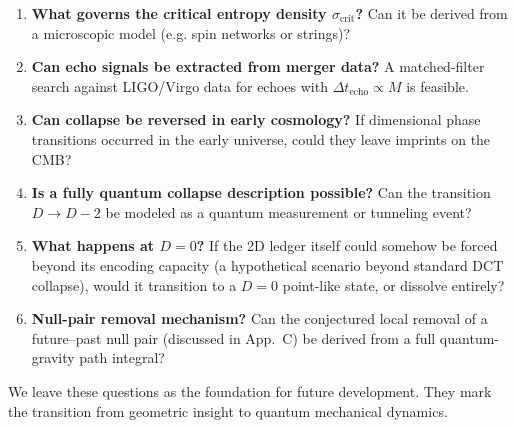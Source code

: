 \documentclass[a4paper, 12pt, oneside]{book}
\numberwithin{equation}{chapter}
\begin{document}
\begin{enumerate}[label=\textbf{Q\arabic*}]
  \item \textbf{What governs the critical entropy density \( \sigma_{\text{crit}} \)?}  
        Can it be derived from a microscopic model (e.g. spin networks or strings)?

  \item \textbf{Can echo signals be extracted from merger data?}  
        A matched-filter search against LIGO/Virgo data for echoes with \( \Delta t_{\text{echo}} \propto M \) is feasible.

  \item \textbf{Can collapse be reversed in early cosmology?}  
        If dimensional phase transitions occurred in the early universe, could they leave imprints on the CMB?

  \item \textbf{Is a fully quantum collapse description possible?}  
        Can the transition \( D \to D-2 \) be modeled as a quantum measurement or tunneling event?

  \item \textbf{What happens at \( D = 0 \)?}  
        If the 2D ledger itself could somehow be forced beyond its encoding capacity (a hypothetical scenario beyond standard DCT collapse), would it transition to a $D=0$
        point-like state, or dissolve entirely?

  \item \textbf{Null-pair removal mechanism?} Can the conjectured local removal of a future–past null pair (discussed in App.~C) be derived from a full quantum-gravity path integral?

\end{enumerate}

\bigskip
\noindent
We leave these questions as the foundation for future development.
They mark the transition from geometric insight to quantum mechanical dynamics.


\cleardoublepage     %

\appendix
\renewcommand\thesection{\thechapter.\arabic{section}}


\end{document}
